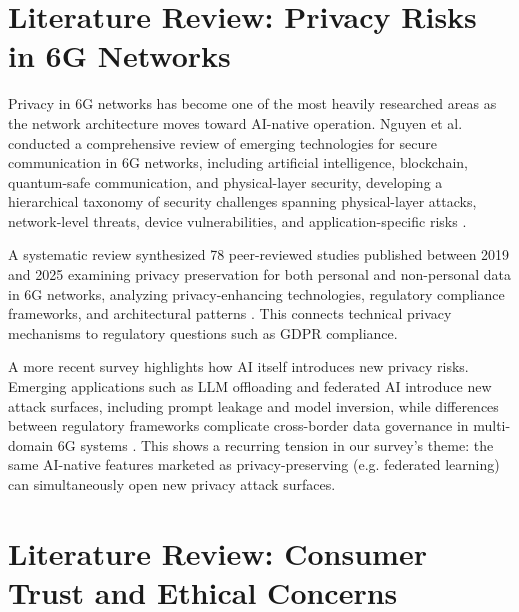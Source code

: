 \section{Literature Review: Privacy Risks in 6G Networks}

Privacy in 6G networks has become one of the most heavily researched areas as the
network architecture moves toward AI-native operation. Nguyen et al. conducted a
comprehensive review of emerging technologies for secure communication in 6G networks,
including artificial intelligence, blockchain, quantum-safe communication, and
physical-layer security, developing a hierarchical taxonomy of security challenges
spanning physical-layer attacks, network-level threats, device vulnerabilities, and
application-specific risks \cite{nguyen2021}.

A systematic review synthesized 78 peer-reviewed studies published between 2019 and
2025 examining privacy preservation for both personal and non-personal data in 6G
networks, analyzing privacy-enhancing technologies, regulatory compliance frameworks,
and architectural patterns \cite{personaldata2026}. This connects technical privacy
mechanisms to regulatory questions such as GDPR compliance.

A more recent survey highlights how AI itself introduces new privacy risks. Emerging
applications such as LLM offloading and federated AI introduce new attack surfaces,
including prompt leakage and model inversion, while differences between regulatory
frameworks complicate cross-border data governance in multi-domain 6G systems
\cite{personaldata2026}. This shows a recurring tension in our survey's theme: the
same AI-native features marketed as privacy-preserving (e.g. federated learning) can
simultaneously open new privacy attack surfaces.




\section{Literature Review: Consumer Trust and Ethical Concerns}

